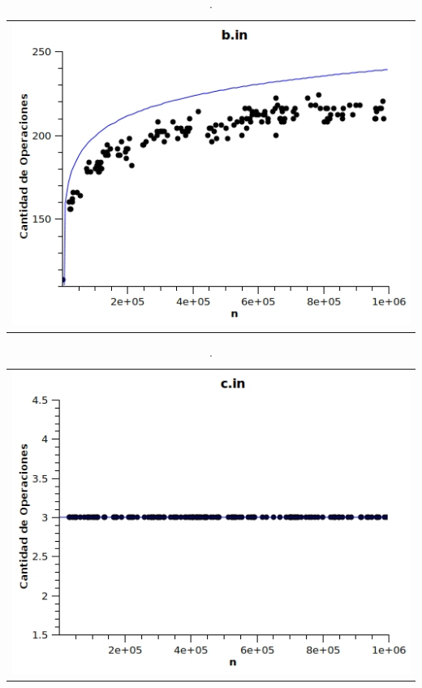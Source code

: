 	\begin{table}[ht]
		\centering 
			\begin{tabular}{c}
				\includegraphics[scale = 0.8]{./../ej1/tests/b.jpg}
			\end{tabular}
			\caption{.} 
	\end{table}

	\begin{table}[ht]
		\centering 
			\begin{tabular}{c}
				\includegraphics[scale = 0.8]{./../ej1/tests/c.jpg}
			\end{tabular}
			\caption{.} 
	\end{table}

